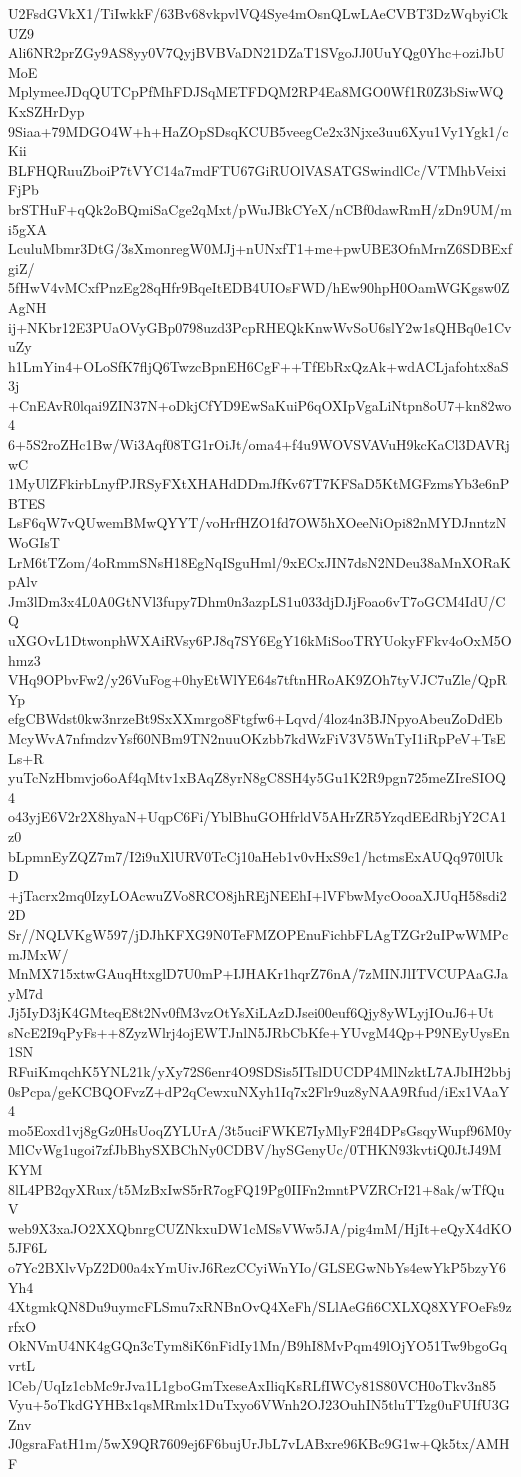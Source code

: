 U2FsdGVkX1/TiIwkkF/63Bv68vkpvlVQ4Sye4mOsnQLwLAeCVBT3DzWqbyiCkUZ9
Ali6NR2prZGy9AS8yy0V7QyjBVBVaDN21DZaT1SVgoJJ0UuYQg0Yhc+oziJbUMoE
MplymeeJDqQUTCpPfMhFDJSqMETFDQM2RP4Ea8MGO0Wf1R0Z3bSiwWQKxSZHrDyp
9Siaa+79MDGO4W+h+HaZOpSDsqKCUB5veegCe2x3Njxe3uu6Xyu1Vy1Ygk1/cKii
BLFHQRuuZboiP7tVYC14a7mdFTU67GiRUOlVASATGSwindlCc/VTMhbVeixiFjPb
brSTHuF+qQk2oBQmiSaCge2qMxt/pWuJBkCYeX/nCBf0dawRmH/zDn9UM/mi5gXA
LculuMbmr3DtG/3sXmonregW0MJj+nUNxfT1+me+pwUBE3OfnMrnZ6SDBExfgiZ/
5fHwV4vMCxfPnzEg28qHfr9BqeItEDB4UIOsFWD/hEw90hpH0OamWGKgsw0ZAgNH
ij+NKbr12E3PUaOVyGBp0798uzd3PcpRHEQkKnwWvSoU6slY2w1sQHBq0e1CvuZy
h1LmYin4+OLoSfK7fljQ6TwzcBpnEH6CgF++TfEbRxQzAk+wdACLjafohtx8aS3j
+CnEAvR0lqai9ZIN37N+oDkjCfYD9EwSaKuiP6qOXIpVgaLiNtpn8oU7+kn82wo4
6+5S2roZHc1Bw/Wi3Aqf08TG1rOiJt/oma4+f4u9WOVSVAVuH9kcKaCl3DAVRjwC
1MyUlZFkirbLnyfPJRSyFXtXHAHdDDmJfKv67T7KFSaD5KtMGFzmsYb3e6nPBTES
LsF6qW7vQUwemBMwQYYT/voHrfHZO1fd7OW5hXOeeNiOpi82nMYDJnntzNWoGIsT
LrM6tTZom/4oRmmSNsH18EgNqISguHml/9xECxJIN7dsN2NDeu38aMnXORaKpAlv
Jm3lDm3x4L0A0GtNVl3fupy7Dhm0n3azpLS1u033djDJjFoao6vT7oGCM4IdU/CQ
uXGOvL1DtwonphWXAiRVsy6PJ8q7SY6EgY16kMiSooTRYUokyFFkv4oOxM5Ohmz3
VHq9OPbvFw2/y26VuFog+0hyEtWlYE64s7tftnHRoAK9ZOh7tyVJC7uZle/QpRYp
efgCBWdst0kw3nrzeBt9SxXXmrgo8Ftgfw6+Lqvd/4loz4n3BJNpyoAbeuZoDdEb
McyWvA7nfmdzvYsf60NBm9TN2nuuOKzbb7kdWzFiV3V5WnTyI1iRpPeV+TsELs+R
yuTcNzHbmvjo6oAf4qMtv1xBAqZ8yrN8gC8SH4y5Gu1K2R9pgn725meZIreSIOQ4
o43yjE6V2r2X8hyaN+UqpC6Fi/YblBhuGOHfrldV5AHrZR5YzqdEEdRbjY2CA1z0
bLpmnEyZQZ7m7/I2i9uXlURV0TcCj10aHeb1v0vHxS9c1/hctmsExAUQq970lUkD
+jTacrx2mq0IzyLOAcwuZVo8RCO8jhREjNEEhI+lVFbwMycOooaXJUqH58sdi22D
Sr//NQLVKgW597/jDJhKFXG9N0TeFMZOPEnuFichbFLAgTZGr2uIPwWMPcmJMxW/
MnMX715xtwGAuqHtxglD7U0mP+IJHAKr1hqrZ76nA/7zMINJlITVCUPAaGJayM7d
Jj5IyD3jK4GMteqE8t2Nv0fM3vzOtYsXiLAzDJsei00euf6Qjy8yWLyjIOuJ6+Ut
sNcE2I9qPyFs++8ZyzWlrj4ojEWTJnlN5JRbCbKfe+YUvgM4Qp+P9NEyUysEn1SN
RFuiKmqchK5YNL21k/yXy72S6enr4O9SDSis5ITslDUCDP4MlNzktL7AJbIH2bbj
0sPcpa/geKCBQOFvzZ+dP2qCewxuNXyh1Iq7x2Flr9uz8yNAA9Rfud/iEx1VAaY4
mo5Eoxd1vj8gGz0HsUoqZYLUrA/3t5uciFWKE7IyMlyF2fl4DPsGsqyWupf96M0y
MlCvWg1ugoi7zfJbBhySXBChNy0CDBV/hySGenyUc/0THKN93kvtiQ0JtJ49MKYM
8lL4PB2qyXRux/t5MzBxIwS5rR7ogFQ19Pg0IIFn2mntPVZRCrI21+8ak/wTfQuV
web9X3xaJO2XXQbnrgCUZNkxuDW1cMSsVWw5JA/pig4mM/HjIt+eQyX4dKO5JF6L
o7Yc2BXlvVpZ2D00a4xYmUivJ6RezCCyiWnYIo/GLSEGwNbYs4ewYkP5bzyY6Yh4
4XtgmkQN8Du9uymcFLSmu7xRNBnOvQ4XeFh/SLlAeGfi6CXLXQ8XYFOeFs9zrfxO
OkNVmU4NK4gGQn3cTym8iK6nFidIy1Mn/B9hI8MvPqm49lOjYO51Tw9bgoGqvrtL
lCeb/UqIz1cbMc9rJva1L1gboGmTxeseAxIliqKsRLfIWCy81S80VCH0oTkv3n85
Vyu+5oTkdGYHBx1qsMRmlx1DuTxyo6VWnh2OJ23OuhIN5tluTTzg0uFUIfU3GZnv
J0gsraFatH1m/5wX9QR7609ej6F6bujUrJbL7vLABxre96KBc9G1w+Qk5tx/AMHF
